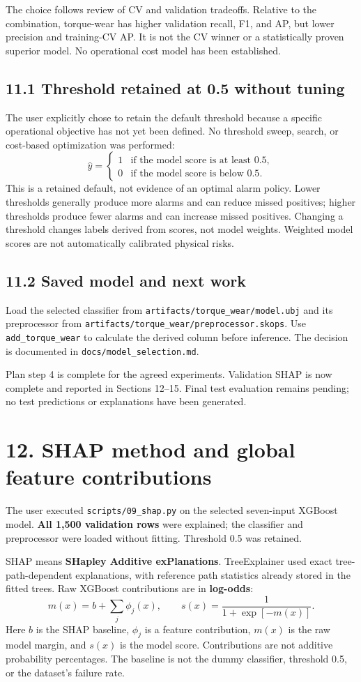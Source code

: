 \documentclass[11pt,a4paper]{article}
\newcommand{\filepath}[1]{\nolinkurl{#1}}
\newcommand{\pagetitle}[1]{\section*{#1}}
\begin{document}
The choice follows review of CV and validation tradeoffs. Relative to the
combination, torque-wear has higher validation recall, F1, and AP, but lower
precision and training-CV AP. It is not the CV winner or a statistically
proven superior model. No operational cost model has been established.

\subsection*{11.1 Threshold retained at 0.5 without tuning}
The user explicitly chose to retain the default threshold because a specific
operational objective has not yet been defined. No threshold sweep, search,
or cost-based optimization was performed:
\[
\hat{y} =
\begin{cases}
1 & \text{if the model score is at least }0.5,\\
0 & \text{if the model score is below }0.5.
\end{cases}
\]
This is a retained default, not evidence of an optimal alarm policy. Lower
thresholds generally produce more alarms and can reduce missed positives;
higher thresholds produce fewer alarms and can increase missed positives.
Changing a threshold changes labels derived from scores, not model weights.
Weighted model scores are not automatically calibrated physical risks.

\subsection*{11.2 Saved model and next work}
Load the selected classifier from \filepath{artifacts/torque_wear/model.ubj}
and its preprocessor from
\filepath{artifacts/torque_wear/preprocessor.skops}. Use
\filepath{add_torque_wear} to calculate the derived column before inference.
The decision is documented in \filepath{docs/model_selection.md}.

Plan step 4 is complete for the agreed experiments. Validation SHAP is now
complete and reported in Sections 12--15. Final test evaluation remains
pending; no test predictions or explanations have been generated.


\newpage
\pagetitle{12. SHAP method and global feature contributions}
The user executed \filepath{scripts/09_shap.py} on the selected seven-input
XGBoost model. \textbf{All 1,500 validation rows} were explained; the classifier
and preprocessor were loaded without fitting. Threshold 0.5 was retained.

SHAP means \textbf{SHapley Additive exPlanations}. TreeExplainer used exact
tree-path-dependent explanations, with reference path statistics already
stored in the fitted trees. Raw XGBoost contributions are in \textbf{log-odds}:
\[
m(x)=b+\sum_j\phi_j(x),\qquad
s(x)=\frac{1}{1+\exp[-m(x)]}.
\]
Here \(b\) is the SHAP baseline, \(\phi_j\) is a feature contribution, \(m(x)\)
is the raw model margin, and \(s(x)\) is the model score. Contributions are not
additive probability percentages. The baseline is not the dummy classifier,
threshold 0.5, or the dataset's failure rate.
\end{document}
